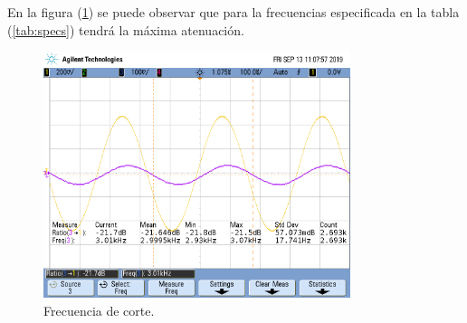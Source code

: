 En la figura (\ref{fig:fcbr}) se puede observar que para la frecuencias especificada en la tabla (\ref{tab:specs}) tendrá la máxima atenuación.
\begin{figure}[H]	
	\centering
	\includegraphics[width=0.8\textwidth, trim = {0 3.35cm 0 2cm},clip]{ImagenesEj2/MedicionesGrilla/fc_br.png}
	\caption{Frecuencia de corte.}
	\label{fig:fcbr}
\end{figure}
\newpage
